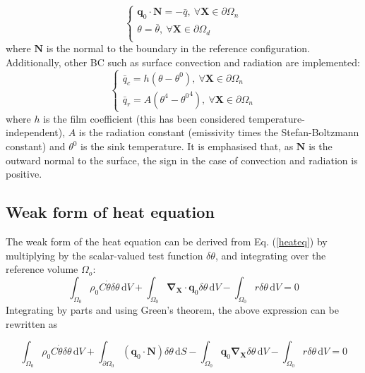 \documentclass[oneside,11pt,times]{book}
\begin{document}
\begin{equation}
\begin{cases}
\bm{q}_0\cdot\bm{N}=-\bar{q}, \: \forall \bm{X} \in \partial \Omega_n\\
\theta=\bar{\theta}, \: \forall \bm{X} \in \partial \Omega_d\\
\end{cases}
\label{boundaryconditions}
\end{equation}
where $\bm{N}$ is the normal to the boundary in the reference configuration.\\
Additionally, other BC such as surface convection and radiation are implemented:
\begin{equation}
\begin{cases}
\bar{q}_c=h(\theta-\theta^0), \: \forall \bm{X} \in \partial \Omega_n\\
\bar{q}_r=A\left(\theta^4-{\theta^0}^4\right), \: \forall \bm{X} \in \partial \Omega_n
\end{cases}
\label{boundaryconditions2}
\end{equation}
where $h$ is the film coefficient (this has been considered temperature-independent), $A$ is the radiation constant (emissivity times the Stefan-Boltzmann constant) and $\theta^0$ is the sink temperature. It is emphasised that, as $\bm{N}$ is the outward normal to the surface, the sign in the case of convection and radiation is positive.
\subsection{Weak form of heat equation}
 \label{subsectionWeakFormHeat}
The weak form of the heat equation can be derived from Eq. (\ref{heateq}) by multiplying by the scalar-valued test function $\delta\theta$, and integrating over the reference volume $\Omega_{o}$:
%
\begin{equation} \label{equationWeakFormHeat0}
\int_{\Omega_0} \rho_0C\dot{\theta}\delta\theta\, \text{d} V+\int_{\Omega_0}\bm{\nabla_{X}}\cdot\bm{q}_0\delta\theta\, \text{d} V-\int_{\Omega_0}r\delta\theta\, \text{d} V=0
\end{equation}
Integrating by parts and using Green’s theorem, the above expression can be rewritten as

\begin{equation} \label{equationWeakFormHeat}
\int_{\Omega_0} \rho_0C\dot{\theta}\delta\theta\, \text{d} V+\int_{\partial \Omega_0} (\bm{q}_0 \cdot \bm{N}) \delta\theta \, \text{d} S-\int_{\Omega_0}\bm{q}_0\bm{\nabla_{X}}\delta\theta\, \text{d} V-\int_{\Omega_0}r\delta\theta\, \text{d} V=0
\end{equation}
%
\end{document}
